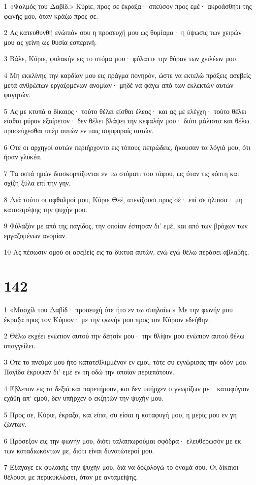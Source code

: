 \par 1 «Ψαλμός του Δαβίδ.» Κύριε, προς σε έκραξα· σπεύσον προς εμέ· ακροάσθητι της φωνής μου, όταν κράζω προς σε.
\par 2 Ας κατευθυνθή ενώπιόν σου η προσευχή μου ως θυμίαμα· η ύψωσις των χειρών μου ας γείνη ως θυσία εσπερινή.
\par 3 Βάλε, Κύριε, φυλακήν εις το στόμα μου· φύλαττε την θύραν των χειλέων μου.
\par 4 Μη εκκλίνης την καρδίαν μου εις πράγμα πονηρόν, ώστε να εκτελώ πράξεις ασεβείς μετά ανθρώπων εργαζομένων ανομίαν· μηδέ να φάγω από των εκλεκτών αυτών φαγητών.
\par 5 Ας με κτυπά ο δίκαιος· τούτο θέλει είσθαι έλεος· και ας με ελέγχη· τούτο θέλει είσθαι μύρον εξαίρετον· δεν θέλει βλάψει την κεφαλήν μου· διότι μάλιστα και θέλω προσεύχεσθαι υπέρ αυτών εν ταις συμφοραίς αυτών.
\par 6 Ότε οι αρχηγοί αυτών περιήρχοντο εις τόπους πετρώδεις, ήκουσαν τα λόγιά μου, ότι ήσαν γλυκέα.
\par 7 Τα οστά ημών διασκορπίζονται εν τω στόματι του τάφου, ως όταν τις κόπτη και σχίζη ξύλα επί την γην.
\par 8 Διά τούτο οι οφθαλμοί μου, Κύριε Θεέ, ατενίζουσι προς σέ· επί σε ήλπισα· μη καταστρέψης την ψυχήν μου.
\par 9 Φύλαξόν με από της παγίδος, την οποίαν έστησαν δι' εμέ, και από των βρόχων των εργαζομένων ανομίαν.
\par 10 Ας πέσωσιν ομού οι ασεβείς εις τα δίκτυα αυτών, ενώ εγώ θέλω περάσει αβλαβής.

\chapter{142}

\par 1 «Μασχίλ του Δαβίδ· προσευχή ότε ήτο εν τω σπηλαίω.» Με την φωνήν μου έκραξα προς τον Κύριον· με την φωνήν μου προς τον Κύριον εδεήθην.
\par 2 Θέλω εκχέει ενώπιον αυτού την δέησίν μου· την θλίψιν μου ενώπιον αυτού θέλω απαγγείλει.
\par 3 Ότε το πνεύμά μου ήτο κατατεθλιμμένον εν εμοί, τότε συ εγνώρισας την οδόν μου. Παγίδα έκρυψαν δι' εμέ εν τη οδώ την οποίαν περιεπάτουν.
\par 4 Έβλεπον εις τα δεξιά και παρετήρουν, και δεν υπήρχεν ο γνωρίζων με· καταφύγιον εχάθη απ' εμού, δεν υπήρχεν ο εκζητών την ψυχήν μου.
\par 5 Προς σε, Κύριε, έκραξα, και είπα, συ είσαι η καταφυγή μου, η μερίς μου εν γη ζώντων.
\par 6 Πρόσεξον εις την φωνήν μου, διότι ταλαιπωρούμαι σφόδρα· ελευθέρωσόν με εκ των καταδιωκόντων με, διότι είναι δυνατώτεροί μου.
\par 7 Εξάγαγε εκ φυλακής την ψυχήν μου, διά να δοξολογώ το όνομά σου. Οι δίκαιοι θέλουσι με περικυκλώσει, όταν με ανταμείψης.

